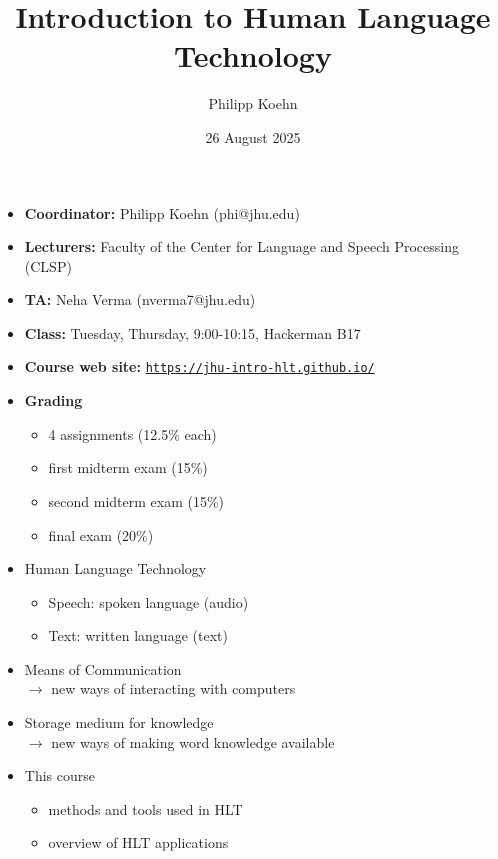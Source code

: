 \documentclass[landscape]{jhuslides3C}
\begin{document}
\rm
\title[Introduction to Human Language Technology: Introduction]{Introduction to Human Language Technology}
\author[Philipp Koehn]{Philipp Koehn}
\date{26 August 2025}
\maketitle


\vfill
\begin{itemize} \itemsep 0mm
\item \textbf{Coordinator:} Philipp Koehn (phi@jhu.edu)
\item \textbf{Lecturers:} Faculty of the Center for Language and Speech Processing (CLSP)
\item \textbf{TA:} Neha Verma (nverma7@jhu.edu)
\item \textbf{Class:} Tuesday, Thursday, 9:00-10:15, Hackerman B17
\item \textbf{Course web site:} \href{https://jhu-intro-hlt.github.io/}{\tt https://jhu-intro-hlt.github.io/}
\item \textbf{Grading} \vspace{-3mm}
\begin{itemize}
\item 4 assignments (12.5\% each)
\item first midterm exam (15\%)
\item second midterm exam (15\%)
\item final exam (20\%)
\end{itemize}
\end{itemize}
\vfill


\vfill
\begin{itemize}
\item Human Language Technology
\begin{itemize}
\item Speech: spoken language (audio)
\item Text: written language (text)
\end{itemize}
\item Means of Communication\\
$\rightarrow$ new ways of interacting with computers
\item Storage medium for knowledge\\
$\rightarrow$ new ways of making word knowledge available
\item This course
\begin{itemize}
\item methods and tools used in HLT
\item overview of HLT applications
\end{itemize}
\end{itemize}
\vfill
\end{document}
